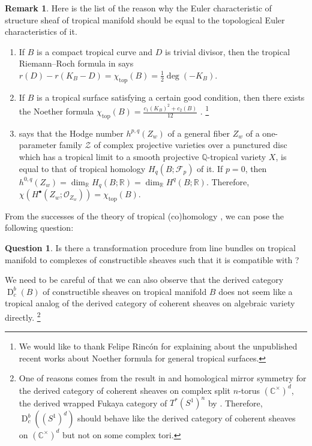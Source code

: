 \documentclass[a4paper,dvipdfmx,reqno,12pt]{amsart}
\theoremstyle{definition}
\newtheorem{question}[theorem]{Question}
\newtheorem{remark}[theorem]{Remark}
\newcommand{\C}{\mathbb{C}}%
\newcommand{\opn}[1]{\operatorname{#1}}
\newcommand{\myfootnote}[1]{\hspace{-5pt}\footnote{#1}}
\numberwithin{equation}{section}
\begin{document}
\begin{remark} \label{remark-list-tropical-euler}
Here is the list of the reason why the Euler 
characteristic of structure sheaf of tropical manifold
should be equal to the topological Euler characteristics of it.
\begin{enumerate}
\item If $B$ is a compact tropical curve and $D$ 
is trivial divisor, then the tropical Riemann--Roch 
formula in 
\cite{gathmannRiemannRochTheoremTropical2008a}
says $r(D)-r(K_B-D)=\chi_{\opn{top}}(B)=\frac{1}{2}\opn{deg}(-K_B)$. 
\item If $B$ is a tropical surface satisfying a certain 
good condition, then there exists the Noether formula
$\chi_{\opn{top}}(B)=\frac{c_1(K_B)^{2} +c_2(B)}{12}$ 
\cite[Theorem 5.1]{shawTropicalSurfaces2015a}.
\myfootnote{We would like to thank Felipe Rinc\'on 
for explaining about the unpublished recent works
about Noether formula for general tropical surfaces.
}
\item 
\cite[Corollary 2]{itenbergTropicalHomology2019b} says 
that the Hodge number $h^{p,q}(Z_w)$ of a general fiber $Z_w$ of
a one-parameter family $\mathcal{Z}$ of 
complex projective varieties over a punctured disc which 
has a tropical limit to a smooth projective 
$\mathbb{Q}$-tropical variety $X$, 
is equal to that of tropical homology 
$H_{q}(B;\mathcal{F}_p)$ of it. If $p=0$, then
$h^{0,q}(Z_w)=\dim_{\mathbb{R}}H_{q}(B;\mathbb{R})
=\dim_{\mathbb{R}} H^{q}(B;\mathbb{R})$.
Therefore, $\chi(H^{\bullet}(Z_w;\mathcal{O}_{Z_w}))=
\chi_{\opn{top}}(B)$.
\end{enumerate}

\end{remark}

From the successes of the theory of
 tropical (co)homology 
\cite{itenbergTropicalHomology2019b}, we can pose 
the following question:

\begin{question} \label{qustion-tropical-lcc}
Is there a transformation procedure 
from line bundles on tropical manifold to complexes
of constructible sheaves such that it is 
compatible with \cite{itenbergTropicalHomology2019b}?
\end{question}
We need to 
be careful of that we can also observe that
the derived category $\opn{D}_{c}^{b}(B)$
of constructible sheaves on 
tropical manifold $B$ does not seem like a tropical 
analog of the derived category of coherent 
sheaves on algebraic variety directly.
\myfootnote{One of reasons
comes from the result in \cite{MR2449059,MR2565051}
and homological mirror symmetry for 
the derived category of coherent sheaves on complex split $n$-torus 
$(\C^{\times})^{d}$, the derived wrapped Fukaya category of $T^{*}(S^{1})^{n}$
by \cite{MR2822213}.
Therefore, $\opn{D}_c^{b}((S^{1})^{d})$ should behave like 
the derived category of coherent sheaves on 
$(\C^{\times})^{d}$
but not on some complex tori.

}
\end{document}

